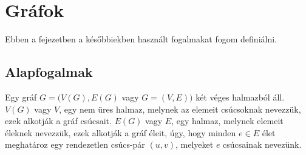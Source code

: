 \chapter{Gráfok}\label{ch:ALAP}

\begin{osszefoglal}
	Ebben a fejezetben a későbbiekben használt fogalmakat fogom definiálni.
	
\end{osszefoglal}

\section{Alapfogalmak}\label{sec:ALAP:adatelem}

Egy gráf \(G = (V(G),E(G)\) vagy \(G = (V,E))\) két véges halmazból áll. \(V(G)\) vagy \(V\), egy nem üres halmaz, melynek az elemeit csúcsoknak nevezzük, ezek alkotják a gráf csúcsait. \(E(G)\) vagy \(E\), egy halmaz, melynek elemeit éleknek nevezzük, ezek alkotják a gráf éleit, úgy, hogy minden \(e \in E\) élet meghatároz egy rendezetlen csúcs-pár \((u,v)\), melyeket \(e\) csúcsainak nevezünk.

